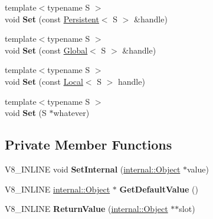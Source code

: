 \begin{DoxyCompactItemize}
\item 
{\footnotesize template$<$typename S $>$ }\\void {\bfseries Set} (const \hyperlink{classv8_1_1_persistent}{Persistent}$<$ S $>$ \&handle)\hypertarget{classv8_1_1_return_value_a2ff02f4be7d7fdcf0e21be43dfd4fe43}{}\label{classv8_1_1_return_value_a2ff02f4be7d7fdcf0e21be43dfd4fe43}

\item 
{\footnotesize template$<$typename S $>$ }\\void {\bfseries Set} (const \hyperlink{classv8_1_1_global}{Global}$<$ S $>$ \&handle)\hypertarget{classv8_1_1_return_value_a57c4b962cf2ca387d3fb9a2f8e47a963}{}\label{classv8_1_1_return_value_a57c4b962cf2ca387d3fb9a2f8e47a963}

\item 
{\footnotesize template$<$typename S $>$ }\\void {\bfseries Set} (const \hyperlink{classv8_1_1_local}{Local}$<$ S $>$ handle)\hypertarget{classv8_1_1_return_value_a69d99ab0e0c12d68291d425287532799}{}\label{classv8_1_1_return_value_a69d99ab0e0c12d68291d425287532799}

\item 
{\footnotesize template$<$typename S $>$ }\\void {\bfseries Set} (S $\ast$whatever)\hypertarget{classv8_1_1_return_value_a766f60aa4d7d86bfb949d3c40b147ef7}{}\label{classv8_1_1_return_value_a766f60aa4d7d86bfb949d3c40b147ef7}

\end{DoxyCompactItemize}
\subsection*{Private Member Functions}
\begin{DoxyCompactItemize}
\item 
V8\+\_\+\+I\+N\+L\+I\+NE void {\bfseries Set\+Internal} (\hyperlink{classv8_1_1internal_1_1_object}{internal\+::\+Object} $\ast$value)\hypertarget{classv8_1_1_return_value_a364b24a88d730fc7fd0eab0e7c3cd708}{}\label{classv8_1_1_return_value_a364b24a88d730fc7fd0eab0e7c3cd708}

\item 
V8\+\_\+\+I\+N\+L\+I\+NE \hyperlink{classv8_1_1internal_1_1_object}{internal\+::\+Object} $\ast$ {\bfseries Get\+Default\+Value} ()\hypertarget{classv8_1_1_return_value_af30c5efde16a4242b10c9d9a01a8ddff}{}\label{classv8_1_1_return_value_af30c5efde16a4242b10c9d9a01a8ddff}

\item 
V8\+\_\+\+I\+N\+L\+I\+NE {\bfseries Return\+Value} (\hyperlink{classv8_1_1internal_1_1_object}{internal\+::\+Object} $\ast$$\ast$slot)\hypertarget{classv8_1_1_return_value_ae696ba3e11a56243aa19f8875e71b72c}{}\label{classv8_1_1_return_value_ae696ba3e11a56243aa19f8875e71b72c}

\end{DoxyCompactItemize}
